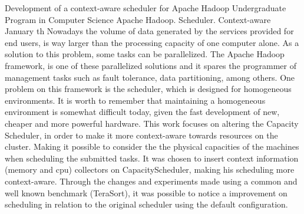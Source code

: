 \documentclass[diss]{mdtufsm}
\begin{document}
\begin{abstract}
Hoje em dia, o volume de dados gerados é muito maior do que a capacidade de processamento dos computadores. Como solução para esse problema, algumas tarefas podem ser paralelizadas ou distribuídas. O \emph{framework Apache Hadoop} \cite{Hadoop} é uma delas e poupa o programador as terefas de gerenciamento, como tolerância a falhas, particionamento dos dados, entre outros.
Um problema no escalonador do \emph{Apache Hadoop} é que seu foco é em ambientes homogêneos, o que muitas vezes não é possível de se manter. O foco deste trabalho foi na melhora de um escalonador já existente, possuindo como objetivo torná-lo sensível ao contexto, permitindo que as capacidades físicas de cada máquina sejam consideradas na hora da distribuição das tarefas submetidas. Optou-se por inserir coletores de informações de contexto (memória e CPU) no  CapacityScheduler, tornando o comportamento desse sensível ao contexto. Através das mudanças feitas e de experimentos feitos usando um benchmark bem conhecido (TeraSort), foi possível demonstrar uma melhora no escalonamento em relação ao escalonador original com a configuração padrão.
\end{abstract}



\begin{englishabstract}
{Development of a context-aware scheduler for Apache Hadoop}
{Undergraduate Program in Computer Science}
{Apache Hadoop. Scheduler. Context-aware}
{January}
{th}
Nowadays the volume of data generated by the services provided for end users, is way larger than the processing capacity of one computer alone. As a solution to this problem, some tasks can be parallelized. The Apache Hadoop framework, is one of these parallelized solutions and it spares the programmer of management tasks such as fault tolerance, data partitioning, among others.
One problem on this framework is the scheduler, which is designed for homogeneous environments. It is worth to remember that maintaining a homogeneous environment is somewhat difficult today, given the fast development of new, cheaper and more powerful hardware. This work focuses on altering the Capacity Scheduler, in order to make it more context-aware towards resources on the cluster. Making it possible to consider the the physical capacities of the machines when scheduling the submitted tasks. It was chosen to insert context information (memory and cpu) collectors on CapacityScheduler, making his scheduling more context-aware. Through the changes and experiments made using a common and well known benchmark (TeraSort), it was possible to notice a improvement on scheduling in relation to the original scheduler using the default configuration.
\end{englishabstract}
\end{document}
